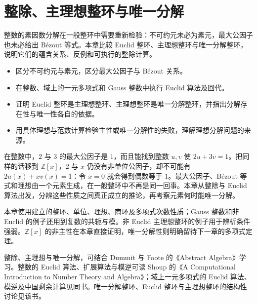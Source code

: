 
\chapter{\texorpdfstring{\mbox{整除、主理想整环}}{整除、主理想整环}\texorpdfstring{\mbox{与唯一分解}}{与唯一分解}}
\label{b1:ch:11}

\begin{chapterabstract}
	整数的素因数分解在一般整环中需要重新检验：不可约元未必为素元，最大公因子也未必给出 Bézout 等式。本章比较 Euclid 整环、主理想整环与唯一分解整环，说明它们的蕴含关系、反例和可执行的整除计算。
\end{chapterabstract}

\begin{learninggoals}
	\begin{itemize}
		\item 区分不可约元与素元，区分最大公因子与 Bézout 关系。
		\item 在整数、域上的一元多项式和 Gauss 整数中执行 Euclid 算法及回代。
		\item 证明 Euclid 整环是主理想整环、主理想整环是唯一分解整环，并指出分解存在性与唯一性各自的依据。
		\item 用具体理想与范数计算检验主性或唯一分解性的失败，理解理想分解问题的来源。
	\end{itemize}
\end{learninggoals}

在整数中，\(2\) 与 \(3\) 的最大公因子是 \(1\)，而且能找到整数 \(u,v\) 使 \(2u+3v=1\)。把同样的话移到 \(\mathbb Z[x]\)，\(2\) 与 \(x\) 仍没有非单位公因子，却不可能有 \(2u(x)+xv(x)=1\)：令 \(x=0\) 就会得到偶数等于 \(1\)。最大公因子、Bézout 等式和理想由一个元素生成，在一般整环中不再是同一回事。本章从整除与 Euclid 算法出发，分辨这些性质之间真正成立的推论，再考察元素何时能唯一分解。

\ProseParagraphBreak

本章使用建立的整环、单位、理想、商环及多项式次数性质；Gauss 整数和非 Euclid 的例子还用到复数的共轭与模。非 Euclid 主理想整环的例子用于辨析条件强弱。\(\mathbb Z[x]\) 的非主性在本章直接证明，唯一分解性则明确留待下一章的多项式定理。

\ProseParagraphBreak
整除、主理想与唯一分解，可结合 Dummit 与 Foote 的《Abstract Algebra》\cite[Sections 8.1--8.3]{DummitFoote2003}学习。整数的 Euclid 算法、扩展算法与模逆可读 Shoup 的《A Computational Introduction to Number Theory and Algebra》\cite[Sections 4.1--4.3]{Shoup2008NumberTheoryAlgebra}；域上一元多项式的 Euclid 算法、模逆及中国剩余计算见同书\cite[Sections 17.3--17.4]{Shoup2008NumberTheoryAlgebra}。唯一分解整环、Euclid 整环与主理想整环的结构性讨论见该书\cite[Section 16.9.1]{Shoup2008NumberTheoryAlgebra}。

